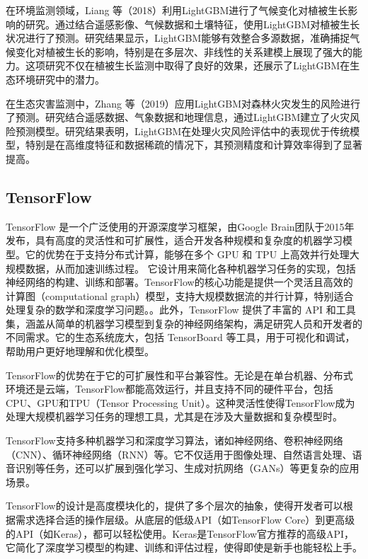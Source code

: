 \documentclass[AutoFakeBold]{LZUThesis-PgD&PhD}
\begin{document}
	在环境监测领域，Liang 等（2018）利用LightGBM进行了气候变化对植被生长影响的研究\cite{liang2018}。通过结合遥感影像、气候数据和土壤特征，使用LightGBM对植被生长状况进行了预测。研究结果显示，LightGBM能够有效整合多源数据，准确捕捉气候变化对植被生长的影响，特别是在多层次、非线性的关系建模上展现了强大的能力。这项研究不仅在植被生长监测中取得了良好的效果，还展示了LightGBM在生态环境研究中的潜力。
	
	在生态灾害监测中，Zhang 等（2019）应用LightGBM对森林火灾发生的风险进行了预测\cite{zhang2019}。研究结合遥感数据、气象数据和地理信息，通过LightGBM建立了火灾风险预测模型。研究结果表明，LightGBM在处理火灾风险评估中的表现优于传统模型，特别是在高维度特征和数据稀疏的情况下，其预测精度和计算效率得到了显著提高。
	
    \subsection{TensorFlow}
	
	TensorFlow 是一个广泛使用的开源深度学习框架，由Google Brain团队于2015年发布，具有高度的灵活性和可扩展性，适合开发各种规模和复杂度的机器学习模型。它的优势在于支持分布式计算，能够在多个 GPU 和 TPU 上高效并行处理大规模数据，从而加速训练过程。
	它设计用来简化各种机器学习任务的实现，包括神经网络的构建、训练和部署。TensorFlow的核心功能是提供一个灵活且高效的计算图（computational graph）模型，支持大规模数据流的并行计算，特别适合处理复杂的数学和深度学习问题。。此外，TensorFlow 提供了丰富的 API 和工具集，涵盖从简单的机器学习模型到复杂的神经网络架构，满足研究人员和开发者的不同需求。它的生态系统庞大，包括 TensorBoard 等工具，用于可视化和调试，帮助用户更好地理解和优化模型。
		
	TensorFlow的优势在于它的可扩展性和平台兼容性。无论是在单台机器、分布式环境还是云端，TensorFlow都能高效运行，并且支持不同的硬件平台，包括CPU、GPU和TPU（Tensor Processing Unit）。这种灵活性使得TensorFlow成为处理大规模机器学习任务的理想工具，尤其是在涉及大量数据和复杂模型时。
	
	TensorFlow支持多种机器学习和深度学习算法，诸如神经网络、卷积神经网络（CNN）、循环神经网络（RNN）等。它不仅适用于图像处理、自然语言处理、语音识别等任务，还可以扩展到强化学习、生成对抗网络（GANs）等更复杂的应用场景。
	
	TensorFlow的设计是高度模块化的，提供了多个层次的抽象，使得开发者可以根据需求选择合适的操作层级。从底层的低级API（如TensorFlow Core）到更高级的API（如Keras），都可以轻松使用。Keras是TensorFlow官方推荐的高级API，它简化了深度学习模型的构建、训练和评估过程，使得即使是新手也能轻松上手。
	
\end{document}
